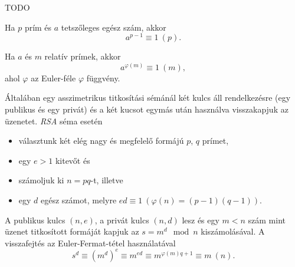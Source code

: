 \begin{exercise}[\Wrap{content/magyar=Kvardratikus maradékok, content/english=Quadratic residues}]
  \begin{solution}
    TODO
  \end{solution}
\end{exercise}


\begin{theorem}
  Ha $p$ prím és $a$ tetszőleges egész szám, akkor\[ a^{p-1}\equiv 1\ (p).\]
\end{theorem}

\begin{theorem}
  Ha $a$ és $m$ relatív prímek, akkor \[ a^{\varphi(m)}\equiv 1\ (m), \] ahol $\varphi$ az
  Euler-féle $\varphi$ függvény.
\end{theorem}

\begin{definition}
  Általában egy asszimetrikus titkosítási sémánál két kulcs áll rendelkezésre (egy publikus és egy
  privát) és a két kucsot egymás után használva visszakapjuk az üzenetet. \emph{RSA} séma esetén
  \begin{itemize}
    \item választunk két elég nagy és megfelelő formájú $p$, $q$ prímet,
    \item egy $e>1$ kitevőt és
    \item számoljuk ki $n=pq$-t, illetve
    \item egy $d$ egész számot, melyre $ed\equiv 1\ (\varphi(n)=(p-1)(q-1))$.
  \end{itemize}
  A publikus kulcs $(n,e)$, a privát kulcs $(n,d)$ lesz és egy $m<n$ szám mint üzenet titkosított
  formáját kapjuk az $s = m^d \mod n$ kiszámolásával. A visszafejtés az Euler-Fermat-tétel
  használatával \[ s^d\equiv (m^d)^e\equiv m^{ed}\equiv m^{\varphi(m)q+1}\equiv m\ (n). \]
\end{definition}

